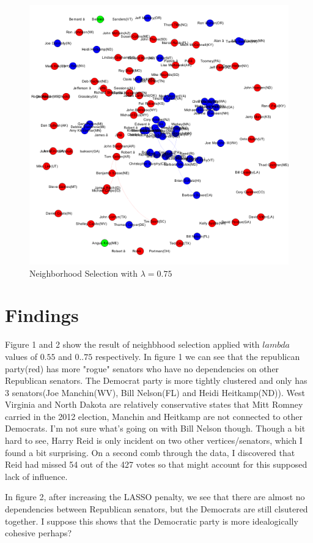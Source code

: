 \documentclass{article}
\begin{document}
\begin{figure} 
\caption{\label{fig: nbd75}Neighborhood Selection with $\lambda = 0.75$}
  \includegraphics[width=\textwidth]{nbd_75.png}
\end{figure}

\section{Findings}
Figure 1 and 2 show the result of neighbhood selection applied with $lambda$ values of $0.55$ and $0..75$ respectively. In figure 1 we can see that the republican party(red) has
more "rogue" senators who have no dependencies on other Republican senators. The Democrat party is more tightly clustered and only has 3 senators(Joe Manchin(WV), Bill Nelson(FL) and Heidi Heitkamp(ND)).  West Virginia and North Dakota are relatively conservative states that Mitt Romney carried in the 2012 election, Manchin and Heitkamp are not connected to other Democrats. I'm not sure what's going on with Bill Nelson though. Though a bit hard to see, Harry Reid is only incident on two other vertices/senators, which I found a bit surprising. On a second comb through the data, I discovered that Reid had missed 54 out of the 427 votes so that might account for this supposed lack of influence. 

In figure 2, after increasing the LASSO penalty, we see that there are almost no dependencies between Republican senators, but the Democrats are still clsutered together. I suppose this shows that the Democratic party is more idealogically cohesive perhaps?
\end{document}
